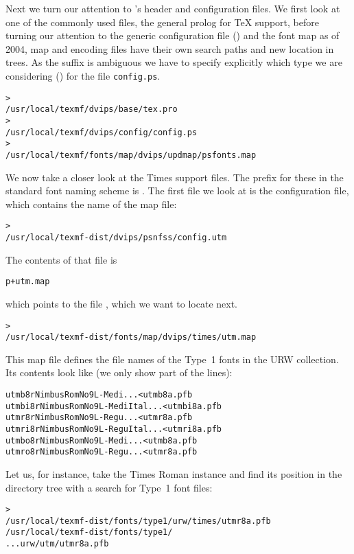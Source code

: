 \documentclass{article}
\begin{document}
\begin{multicols}{2}
Next we turn our attention to 's header and configuration
files.  We first look at one of the commonly used files, the general
prolog  for \TeX{} support, before turning our attention
to the generic configuration file () and the \PS{} font
map \Dash as of 2004, map and encoding files have
their own search paths and new location in  trees.  As
the  suffix is ambiguous we have to specify explicitly which
type we are considering () for the file
\texttt{config.ps}.
\begin{alltt}
> 
   /usr/local/texmf/dvips/base/tex.pro
> 
   /usr/local/texmf/dvips/config/config.ps
> 
   /usr/local/texmf/fonts/map/dvips/updmap/psfonts.map
\end{alltt}

We now take a closer look at the  Times \PS{} support
files.  The prefix for these in the standard font naming scheme is
.  The first file we look at is the configuration file,
which contains the name of the map file:
\begin{alltt}
> 
   /usr/local/texmf-dist/dvips/psnfss/config.utm
\end{alltt}
The contents of that file is
\begin{alltt}
  p +utm.map
\end{alltt}
which points to the file , which we want to
locate next.
\begin{alltt}
> 
   /usr/local/texmf-dist/fonts/map/dvips/times/utm.map
\end{alltt}
This map file defines the file names of the Type~1 \PS{} fonts in
the URW collection.  Its contents look like (we only show part of the
lines):
\begin{alltt}
utmb8r  NimbusRomNo9L-Medi    ... <utmb8a.pfb
utmbi8r NimbusRomNo9L-MediItal... <utmbi8a.pfb
utmr8r  NimbusRomNo9L-Regu    ... <utmr8a.pfb
utmri8r NimbusRomNo9L-ReguItal... <utmri8a.pfb
utmbo8r NimbusRomNo9L-Medi    ... <utmb8a.pfb
utmro8r NimbusRomNo9L-Regu    ... <utmr8a.pfb
\end{alltt}
Let us, for instance, take the Times Roman instance
 and find its position in the  directory
tree with a search for Type~1 font files:
\begin{alltt}
> 
\ifSingleColumn   /usr/local/texmf-dist/fonts/type1/urw/times/utmr8a.pfb
\else   /usr/local/texmf-dist/fonts/type1/
... urw/utm/utmr8a.pfb
\fi\end{alltt}


\end{multicols}
\end{document}
